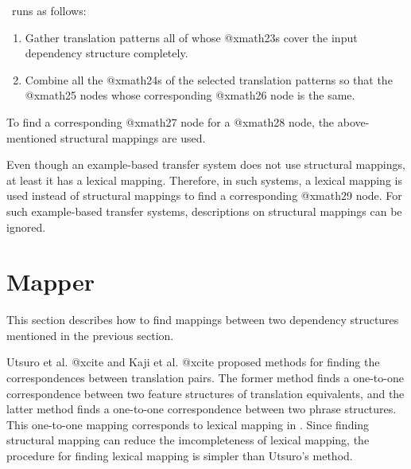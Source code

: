 \SimTran\ runs as follows:
\begin{enumerate}
\item Gather translation patterns all of whose @xmath23s cover
the input dependency structure completely.
\item Combine all the @xmath24s of the selected translation patterns so that
the @xmath25 nodes whose corresponding @xmath26 node is the same.
\end{enumerate}
To find a corresponding @xmath27 node for a @xmath28 node,
the above-mentioned structural mappings are used. 

Even though an example-based transfer system does not use structural mappings,
at least it has a lexical mapping. Therefore, in such systems, a lexical
mapping is used instead of structural mappings to find a corresponding @xmath29
node. For such example-based transfer systems, descriptions on structural
mappings can be ignored.

\section{Mapper}
 

This section describes how to find mappings between two dependency structures
mentioned in the previous section.

Utsuro et al. @xcite and Kaji et al. @xcite proposed methods
for finding the correspondences between translation pairs.  The former method
finds a one-to-one correspondence between two feature structures of
translation equivalents, and the latter method finds a one-to-one
correspondence between two phrase structures. This one-to-one mapping
corresponds to lexical mapping in \SimTran. Since finding structural mapping
can reduce the imcompleteness of lexical mapping, the procedure for finding
lexical mapping is simpler than Utsuro's method.

